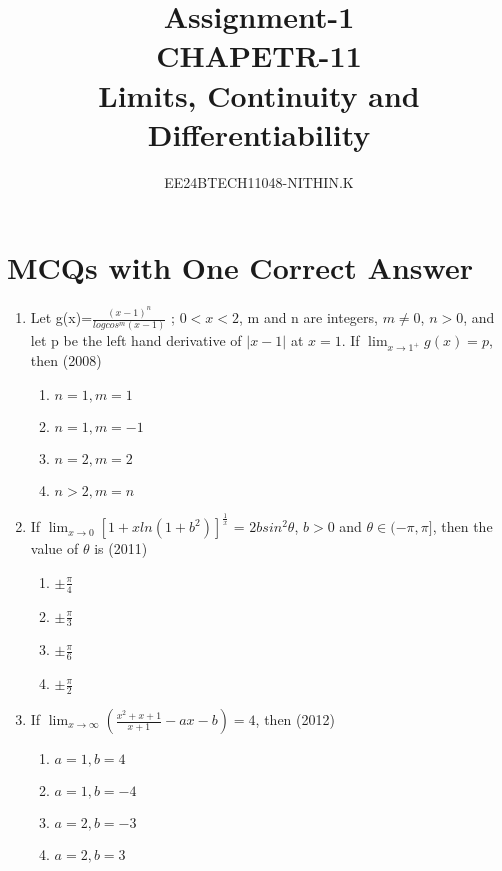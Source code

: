 \documentclass[journal,12pt,twocolumn]{IEEEtran}
\theoremstyle{remark}
\begin{document}


\title{Assignment-1\\CHAPETR-11\\Limits, Continuity and Differentiability}
\author{EE24BTECH11048-NITHIN.K} 
\maketitle
\newpage
\bigskip

\renewcommand{\thefigure}{\theenumi}
\renewcommand{\thetable}{\theenumi}


\section{MCQs with One Correct Answer}


\begin{enumerate} 
\item Let g(x)=$\frac{(x-1)^n}{logcos^m(x-1)}$ ; $0<x<2$, m and n are integers, $m\neq0$, $n>0$, and let p be the left hand derivative of $|x-1|$ at $x=1$. If $\lim_{x \to 1^+}{g(x)=p}$, then \hfill{(2008)} 

\begin{enumerate}[label=\alph*)]
    \item $n=1,m=1$
    \item $n=1,m=-1$
    \item $n=2,m=2$
    \item $n>2,m=n$ \\
\end{enumerate}

\item If $\lim_{x \to 0}[1+xln(1+b^2)]^\frac{1}{x}$ = $2bsin^2\theta$, $b>0$ and $\theta \in (-\pi,\pi]$, then the value of $\theta$ is 
\hfill{(2011)} 

\begin{enumerate}[label=\alph*)]
    \item $\pm\frac{\pi}{4}$
    \item $\pm\frac{\pi}{3}$
    \item $\pm\frac{\pi}{6}$
    \item $\pm\frac{\pi}{2}$ \\
\end{enumerate} 

\item If $\lim_{ x \to \infty}\left(\frac{x^2+x+1}{x+1}-ax-b\right) = 4$, then \hfill{(2012)} 

\begin{enumerate}[label=\alph*)]
    \item $a=1,b=4$
    \item $a=1,b=-4$
    \item $a=2,b=-3$
    \item $a=2,b=3$ \\
\end{enumerate}



\end{enumerate}
\end{document}
